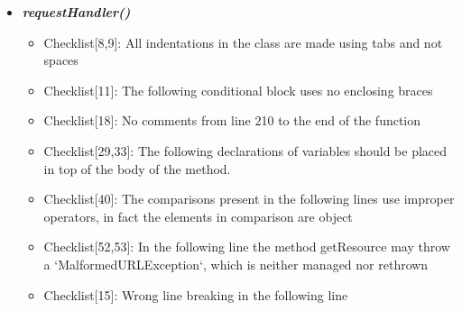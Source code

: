 \documentclass[11pt,titlepage]{article} %
\begin{document}
\begin{itemize}
   \item \textbf{\textit{requestHandler()}}
    \begin{itemize}
     \item Checklist[8,9]: All indentations in the class are made using tabs and not spaces
     \item Checklist[11]: The following conditional block uses no enclosing braces
      
     \item Checklist[18]: No comments from line 210 to the end of the function
     \item Checklist[29,33]: The following declarations of variables should be placed in top of the body of the method.
      
      
     \item Checklist[40]: The comparisons present in the following lines use improper operators, in fact the elements in comparison are object
      
      
      
      
     \item Checklist[52,53]: In the following line the method getResource may throw a `MalformedURLException`, which is neither managed nor rethrown
      
     \item Checklist[15]: Wrong line breaking in the following line
      

    \end{itemize}


\end{itemize}
\end{document}
